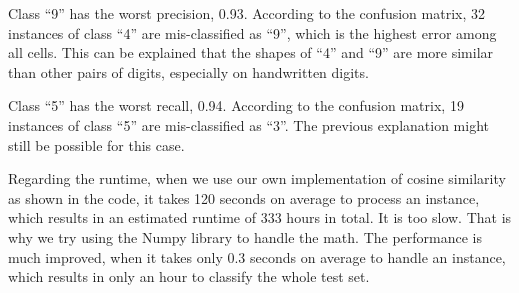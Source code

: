 Class ``9'' has the worst precision, 0.93. According to the confusion matrix, 32 instances of class ``4'' are mis-classified as ``9'', which is the highest error among all cells. This can be explained that the shapes of ``4'' and ``9'' are more similar than other pairs of digits, especially on handwritten digits.

Class ``5'' has the worst recall, 0.94. According to the confusion matrix, 19 instances of class ``5'' are mis-classified as ``3''. The previous explanation might still be possible for this case.

Regarding the runtime, when we use our own implementation of cosine similarity as shown in the code, it takes 120 seconds on average to process an instance, which results in an estimated runtime of 333 hours in total. It is too slow. That is why we try using the Numpy library to handle the math. The performance is much improved, when it takes only 0.3 seconds on average to handle an instance, which results in only an hour to classify the whole test set. 

